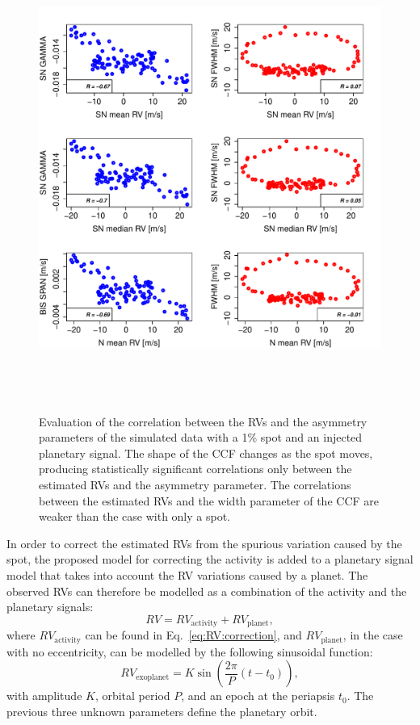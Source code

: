 \documentclass{aa}
\begin{document}
\begin{figure}[htbp]
\begin{center}
\includegraphics[height = 6in]{SOAP_SPOTandPLANET_Comparison_para_SN_withNoise.pdf} 
   \caption{Evaluation of the correlation between the RVs and the asymmetry parameters of the simulated data with a 1\% spot and an injected planetary signal.  The shape of the CCF changes as the spot moves, producing statistically significant correlations only between the estimated RVs and the asymmetry parameter. The correlations between the estimated RVs and the width parameter of the CCF are weaker than the case with only a spot.}
    \label{fig:spot.plus.planet.corr}
\end{center}
\end{figure}

In order to correct the estimated RVs from the spurious variation caused by the spot, the proposed model for correcting the activity is added to a planetary signal model that takes into account the RV variations caused by a planet. The observed RVs can therefore be modelled as a combination of the activity and the planetary signals:
%
\begin{equation}
RV= RV_{\text{activity}} + RV_{\text{planet}},
\label{eq:RV:correction.overall}
\end{equation}
%
where $RV_{\text{activity}}$ can be found in Eq.~\eqref{eq:RV:correction}, and $RV_{\text{planet}}$, in the case with no eccentricity, can be modelled by the following sinusoidal function:
%
\begin{equation}
RV_{\text{exoplanet}}= K \sin \left(\frac{2 \pi}{P} (t - t_{0})\right),
\label{eq:RV:correction.planet}
\end{equation}
%
with amplitude $K$, orbital period $P$, and an epoch at the periapsis $t_{0}$.  The previous three unknown parameters define the planetary orbit.
\end{document}
